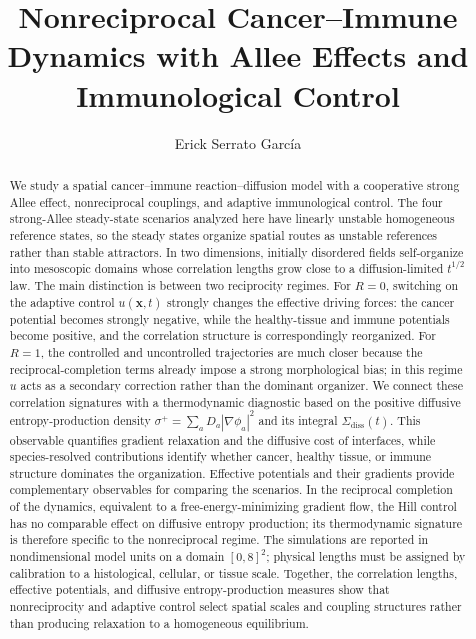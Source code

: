 \documentclass[aps,pre,onecolumn,superscriptaddress,final]{revtex4-2}
\def\mathcal#1{#1}%
\begin{document}
\title{Nonreciprocal Cancer--Immune Dynamics with Allee Effects and Immunological Control}

\author{Erick Serrato Garc\'ia}

\begin{abstract}
We study a spatial cancer--immune reaction--diffusion model with a cooperative strong Allee effect, nonreciprocal couplings, and adaptive immunological control. The four strong-Allee steady-state scenarios analyzed here have linearly unstable homogeneous reference states, so the steady states organize spatial routes as unstable references rather than stable attractors. In two dimensions, initially disordered fields self-organize into mesoscopic domains whose correlation lengths grow close to a diffusion-limited $t^{1/2}$ law. The main distinction is between two reciprocity regimes. For $\mathcal{R}=0$, switching on the adaptive control $u(\mathbf{x},t)$ strongly changes the effective driving forces: the cancer potential becomes strongly negative, while the healthy-tissue and immune potentials become positive, and the correlation structure is correspondingly reorganized. For $\mathcal{R}=1$, the controlled and uncontrolled trajectories are much closer because the reciprocal-completion terms already impose a strong morphological bias; in this regime $u$ acts as a secondary correction rather than the dominant organizer. We connect these correlation signatures with a thermodynamic diagnostic based on the positive diffusive entropy-production density $\sigma^+=\sum_a D_a|\nabla\phi_a|^2$ and its integral $\Sigma_{\mathrm{diss}}(t)$. This observable quantifies gradient relaxation and the diffusive cost of interfaces, while species-resolved contributions identify whether cancer, healthy tissue, or immune structure dominates the organization. Effective potentials and their gradients provide complementary observables for comparing the scenarios. In the reciprocal completion of the dynamics, equivalent to a free-energy-minimizing gradient flow, the Hill control has no comparable effect on diffusive entropy production; its thermodynamic signature is therefore specific to the nonreciprocal regime. The simulations are reported in nondimensional model units on a domain $[0,8]^2$; physical lengths must be assigned by calibration to a histological, cellular, or tissue scale. Together, the correlation lengths, effective potentials, and diffusive entropy-production measures show that nonreciprocity and adaptive control select spatial scales and coupling structures rather than producing relaxation to a homogeneous equilibrium.
\end{abstract}

\maketitle










\end{document}
